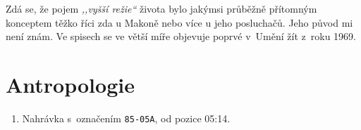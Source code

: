 \begin{enumerate}
{Zdá se, že pojem \textit{,,vyšší režie``} života bylo jakýmsi průběžně přítomným
konceptem těžko říci zda u Makoně nebo více u jeho posluchačů. Jeho původ mi
není znám. Ve spisech se ve větší míře objevuje poprvé v~Umění žít\cite{KaMaUZ}
z~roku 1969.

}

\end{enumerate}

\section{Antropologie}

\begin{enumerate}

\item{
Nahrávka s~označením \texttt{85-05A}, od pozice 05:14.

}
\end{enumerate}
